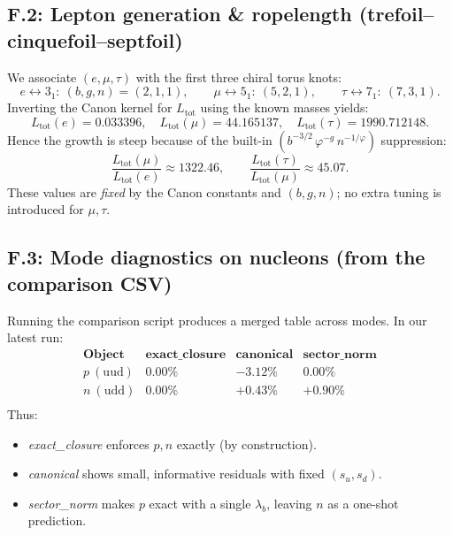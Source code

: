 \subsection*{F.2: Lepton generation \& ropelength (trefoil–cinquefoil–septfoil)}
We associate \((e,\mu,\tau)\) with the first three chiral torus knots:
\[
	e \leftrightarrow 3_1:\ (b,g,n)=(2,1,1),\qquad
	\mu \leftrightarrow 5_1:\ (5,2,1),\qquad
	\tau \leftrightarrow 7_1:\ (7,3,1).
\]
Inverting the Canon kernel for \(L_{\text{tot}}\) using the known masses yields:\footnotesize
\[
	L_{\text{tot}}(e)=0.033396,\quad
	L_{\text{tot}}(\mu)=44.165137,\quad
	L_{\text{tot}}(\tau)=1990.712148.
\]
\normalsize
Hence the growth is steep because of the built-in \((b^{-3/2}\,\varphi^{-g}\,n^{-1/\varphi})\) suppression:
\[
	\frac{L_{\text{tot}}(\mu)}{L_{\text{tot}}(e)}\approx 1322.46,\qquad
	\frac{L_{\text{tot}}(\tau)}{L_{\text{tot}}(\mu)}\approx 45.07.
\]
These values are \emph{fixed} by the Canon constants and \((b,g,n)\); no extra tuning is introduced for \(\mu,\tau\).

\subsection*{F.3: Mode diagnostics on nucleons (from the comparison CSV)}
Running the comparison script produces a merged table across modes. In our latest run:
\[
	\begin{array}{llll}
		\textbf{Object} & \textbf{exact\_closure} & \textbf{canonical} & \textbf{sector\_norm} \\
		\hline
		p\ (\text{uud}) & 0.00\% & {-}3.12\% & 0.00\% \\
		n\ (\text{udd}) & 0.00\% & {+}0.43\% & {+}0.90\% \\
	\end{array}
\]
Thus:
\begin{itemize}
	\item \textit{exact\_closure} enforces \(p,n\) exactly (by construction).
	\item \textit{canonical} shows small, informative residuals with fixed \((s_u,s_d)\).
	\item \textit{sector\_norm} makes \(p\) exact with a single \(\lambda_b\), leaving \(n\) as a one-shot prediction.
\end{itemize}

